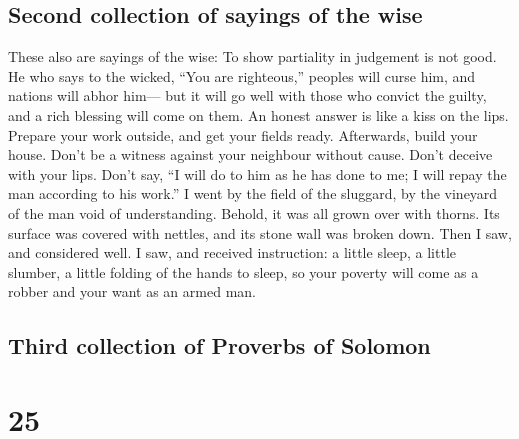 \hypertarget{second-collection-of-sayings-of-the-wise}{%
\subsection{Second collection of sayings of the
wise}\label{second-collection-of-sayings-of-the-wise}}

 These also are sayings of the wise: To show partiality
in judgement is not good.  He who says to the wicked,
``You are righteous,'' peoples will curse him, and nations will abhor
him---  but it will go well with those who convict the
guilty, and a rich blessing will come on them.  An honest
answer is like a kiss on the lips.  Prepare your work
outside, and get your fields ready. Afterwards, build your house.
 Don't be a witness against your neighbour without cause.
Don't deceive with your lips.  Don't say, ``I will do to
him as he has done to me; I will repay the man according to his work.''
 I went by the field of the sluggard, by the vineyard of
the man void of understanding.  Behold, it was all grown
over with thorns. Its surface was covered with nettles, and its stone
wall was broken down.  Then I saw, and considered well. I
saw, and received instruction:  a little sleep, a little
slumber, a little folding of the hands to sleep,  so your
poverty will come as a robber and your want as an armed man.

\hypertarget{third-collection-of-proverbs-of-solomon}{%
\subsection{Third collection of Proverbs of
Solomon}\label{third-collection-of-proverbs-of-solomon}}

\hypertarget{section-24}{%
\section{25}\label{section-24}}

